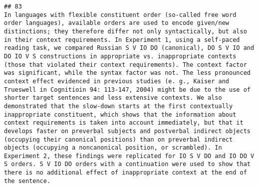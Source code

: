 \documentclass[
  english,
  man]{apa6}
\begin{document}
\begin{verbatim}
## 83                                                                                                                                                                                                                                                                                                                                                                                                                                                                                                                                                                                                                                                                                                                                                                                                                                                                                                                                                                                                                                                                                                                                                                                                                                                             In languages with flexible constituent order (so-called free word order languages), available orders are used to encode given/new distinctions; they therefore differ not only syntactically, but also in their context requirements. In Experiment 1, using a self-paced reading task, we compared Russian S V IO DO (canonical), DO S V IO and DO IO V S constructions in appropriate vs. inappropriate contexts (those that violated their context requirements). The context factor was significant, while the syntax factor was not. The less pronounced context effect evidenced in previous studies (e. g., Kaiser and Trueswell in Cognitioin 94: 113-147, 2004) might be due to the use of shorter target sentences and less extensive contexts. We also demonstrated that the slow-down starts at the first contextually inappropriate constituent, which shows that the information about context requirements is taken into account immediately, but that it develops faster on preverbal subjects and postverbal indirect objects (occupying their canonical positions) than on preverbal indirect objects (occupying a noncanonical position, or scrambled). In Experiment 2, these findings were replicated for IO S V DO and IO DO V S orders. S V IO DO orders with a continuation were used to show that there is no additional effect of inappropriate context at the end of the sentence.

\end{verbatim}
\end{document}
